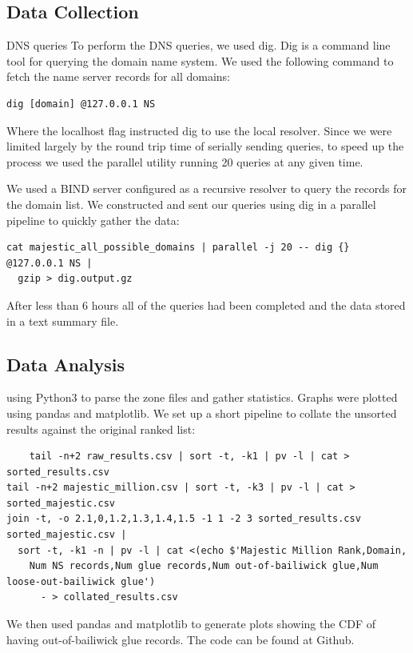 \documentclass{idc_msc}
\begin{document}


\subsection{Data Collection}

DNS queries
To perform the DNS queries, we used dig. Dig is a command line tool for querying the domain name system. We used the following command to fetch the name server records for all domains:
\begin{verbatim}
dig [domain] @127.0.0.1 NS
\end{verbatim}
Where the localhost flag instructed dig to use the local resolver.
Since we were limited largely by the round trip time of serially sending queries, to speed up the process we used the parallel utility running 20 queries at any given time.

We used a BIND server configured as a recursive resolver to query the records for the domain list.
We constructed and sent our queries using dig in a parallel \cite{Tange2011a} pipeline to quickly gather the data:

\begin{verbatim}
cat majestic_all_possible_domains | parallel -j 20 -- dig {} @127.0.0.1 NS | 
  gzip > dig.output.gz
\end{verbatim}

After less than 6 hours all of the queries had been completed and the data stored in a text summary file.

\subsection{Data Analysis}

using Python3 to parse the zone files and gather statistics. Graphs were plotted using pandas and matplotlib.
We set up a short pipeline to collate the unsorted results against the original ranked list:
\begin{verbatim}
	tail -n+2 raw_results.csv | sort -t, -k1 | pv -l | cat > sorted_results.csv
tail -n+2 majestic_million.csv | sort -t, -k3 | pv -l | cat > sorted_majestic.csv
join -t, -o 2.1,0,1.2,1.3,1.4,1.5 -1 1 -2 3 sorted_results.csv sorted_majestic.csv | 
  sort -t, -k1 -n | pv -l | cat <(echo $'Majestic Million Rank,Domain,
    Num NS records,Num glue records,Num out-of-bailiwick glue,Num loose-out-bailiwick glue') 
      - > collated_results.csv
\end{verbatim}
We then used pandas and matplotlib to generate plots showing the CDF of having out-of-bailiwick glue records.
The code can be found at Github\cite{Code}.
\end{document}
